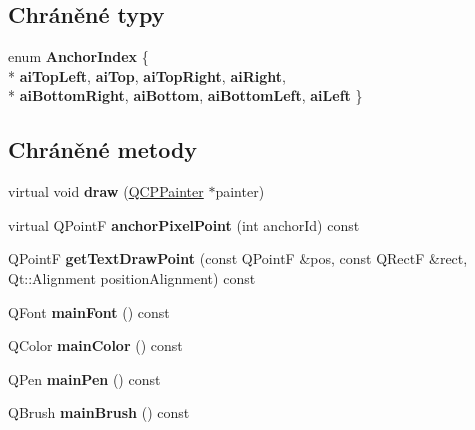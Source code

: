 \subsection*{Chráněné typy}
\begin{DoxyCompactItemize}
\item 
\hypertarget{classQCPItemText_a14a84e58f72519c8ae1d7a4a1dd23f21}{}enum {\bfseries Anchor\+Index} \{ \\*
{\bfseries ai\+Top\+Left}, 
{\bfseries ai\+Top}, 
{\bfseries ai\+Top\+Right}, 
{\bfseries ai\+Right}, 
\\*
{\bfseries ai\+Bottom\+Right}, 
{\bfseries ai\+Bottom}, 
{\bfseries ai\+Bottom\+Left}, 
{\bfseries ai\+Left}
 \}\label{classQCPItemText_a14a84e58f72519c8ae1d7a4a1dd23f21}

\end{DoxyCompactItemize}
\subsection*{Chráněné metody}
\begin{DoxyCompactItemize}
\item 
\hypertarget{classQCPItemText_a8793adb271ab79b4cf391dc55e9987f1}{}virtual void {\bfseries draw} (\hyperlink{classQCPPainter}{Q\+C\+P\+Painter} $\ast$painter)\label{classQCPItemText_a8793adb271ab79b4cf391dc55e9987f1}

\item 
\hypertarget{classQCPItemText_ad248f988534a9d07bc7c220a2457142a}{}virtual Q\+Point\+F {\bfseries anchor\+Pixel\+Point} (int anchor\+Id) const \label{classQCPItemText_ad248f988534a9d07bc7c220a2457142a}

\item 
\hypertarget{classQCPItemText_aa6e478b1ce198eace89157c4cacc3ddc}{}Q\+Point\+F {\bfseries get\+Text\+Draw\+Point} (const Q\+Point\+F \&pos, const Q\+Rect\+F \&rect, Qt\+::\+Alignment position\+Alignment) const \label{classQCPItemText_aa6e478b1ce198eace89157c4cacc3ddc}

\item 
\hypertarget{classQCPItemText_a23d391bd6471c45e73f45add67ede902}{}Q\+Font {\bfseries main\+Font} () const \label{classQCPItemText_a23d391bd6471c45e73f45add67ede902}

\item 
\hypertarget{classQCPItemText_ad7bf17e4945cc86bbf9a36331da059a0}{}Q\+Color {\bfseries main\+Color} () const \label{classQCPItemText_ad7bf17e4945cc86bbf9a36331da059a0}

\item 
\hypertarget{classQCPItemText_a9ade32d362b22853659201c738269e2a}{}Q\+Pen {\bfseries main\+Pen} () const \label{classQCPItemText_a9ade32d362b22853659201c738269e2a}

\item 
\hypertarget{classQCPItemText_a10d6585a030633aa79d5ebc5a437f183}{}Q\+Brush {\bfseries main\+Brush} () const \label{classQCPItemText_a10d6585a030633aa79d5ebc5a437f183}

\end{DoxyCompactItemize}
